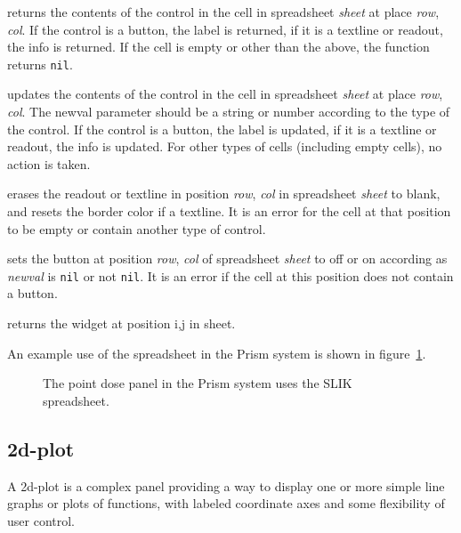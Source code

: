 \documentclass[twoside,openright,11pt]{report}
\newcommand{\tp}[1]{\texttt{#1}}
\begin{document}
{returns the contents of the control in the cell in spreadsheet
\emph{sheet} at place \emph{row}, \emph{col}.  If the control is a
button, the label is returned, if it is a textline or readout, the
info is returned.  If the cell is empty or other than the above, the
function returns \tp{nil}.}

{updates the contents of the control in the cell in spreadsheet
\emph{sheet} at place \emph{row}, \emph{col}.  The newval parameter
should be a string or number according to the type of the control.  If
the control is a button, the label is updated, if it is a textline or
readout, the info is updated.  For other types of cells (including
empty cells), no action is taken.}

{erases the readout or textline in position \emph{row}, \emph{col} in
spreadsheet \emph{sheet} to blank, and resets the border color if a
textline.  It is an error for the cell at that position to be empty or
contain another type of control.}

{sets the button at position \emph{row}, \emph{col} of spreadsheet
\emph{sheet} to off or on according as \emph{newval} is \tp{nil}
or not \tp{nil}.  It is an error if the cell at this position does
not contain a button.}

{returns the widget at position i,j in sheet.}

An example use of the spreadsheet in the Prism system is shown in
figure~\ref{fig:spreadsheet}.

\begin{figure}[htb]
\begin{center}
\vspace*{4mm}
\leavevmode
{}
\end{center}
\caption{The point dose panel in the Prism system uses the SLIK
spreadsheet.} \label{fig:spreadsheet}
\end{figure}

\subsection{2d-plot} \label{sec:2dplot}

A 2d-plot is a complex panel providing a way to display
one or more simple line graphs or plots of functions, with labeled
coordinate axes and some flexibility of user control.
\end{document}
